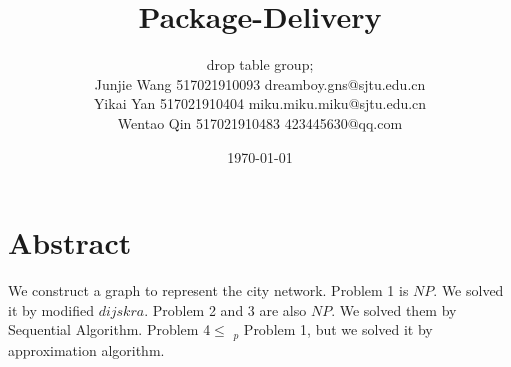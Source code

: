 \documentclass[11pt, a4paper]{article} %
\title{Package-Delivery} %
\author{
drop table group;\\
Junjie Wang 517021910093 dreamboy.gns@sjtu.edu.cn \\
Yikai Yan 517021910404 miku.miku.miku@sjtu.edu.cn \\
Wentao Qin 517021910483 423445630@qq.com
  }
\date{\small \today} %
\begin{document}
%

\maketitle %



\setcounter{page}{1} %

\section{Abstract} %
	We construct a graph to represent the city network. Problem 1 is $NP$. We solved it by modified $dijskra$. Problem 2 and 3 are also $NP$. We solved them by Sequential Algorithm. Problem 4$\leq$ $_p$ Problem 1, but we solved it by approximation algorithm.
\newpage
\tableofcontents
\newpage

\end{document}
